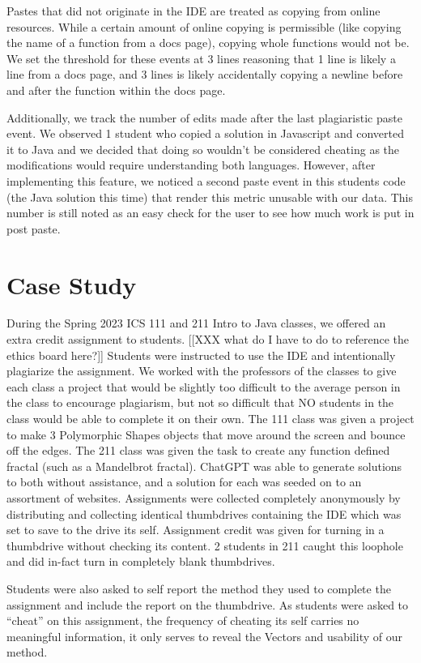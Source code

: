 \documentclass[letterpaper,10pt,conference]{IEEEtran}
\begin{document}
Pastes that did not originate in the IDE are treated as copying from online resources.  While a certain amount of online copying is permissible (like copying the name of a function from a docs page), copying whole functions would not be.  We set the threshold for these events at 3 lines reasoning that 1 line is likely a line from a docs page, and 3 lines is likely accidentally copying a newline before and after the function within the docs page.

Additionally, we track the number of edits made after the last plagiaristic paste event.  We observed 1 student who copied a solution in Javascript and converted it to Java and we decided that doing so wouldn't be considered cheating as the modifications would require understanding both languages.  However, after implementing this feature, we noticed a second paste event in this students code (the Java solution this time)  that render this metric unusable with our data.  This number is still noted as an easy check for the user to see how much work is put in post paste.

\section{Case Study}
During the Spring 2023 ICS 111 and 211 Intro to Java classes, we offered an extra credit assignment to students. [[XXX what do I have to do to reference the ethics board here?]]
Students were instructed to use the IDE and intentionally plagiarize the assignment.  We worked with the professors of the classes to give each class a project that would be slightly too difficult to the average person in the class to encourage plagiarism, but not so difficult that NO students in the class would be able to complete it on their own.  The 111 class was given a project to make 3 Polymorphic Shapes objects that move around the screen and bounce off the edges.  The 211 class was given the task to create any function defined fractal (such as a Mandelbrot fractal).  ChatGPT was able to generate solutions to both without assistance, and a solution for each was seeded on to an assortment of websites.  Assignments were collected completely anonymously by distributing and collecting identical thumbdrives containing the IDE which was set to save to the drive its self.  Assignment credit was given for turning in a thumbdrive without checking its content.  2 students in 211 caught this loophole and did in-fact turn in completely blank thumbdrives.

Students were also asked to self report the method they used to complete the assignment and include the report on the thumbdrive.  As students were asked to ``cheat'' on this assignment, the frequency of cheating its self carries no meaningful information, it only serves to reveal the Vectors and usability of our method.
\end{document}
